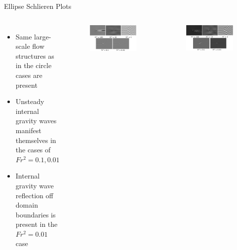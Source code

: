 \documentclass[aspectratio=169,xcolor=dvipsnames]{beamer}
\begin{document}
\begin{frame}{Ellipse Schlieren Plots}
    \begin{columns}[c]
        \begin{itemize}
            \item Same large-scale flow structures as in the circle cases are present
            \item Unsteady internal gravity waves manifest themselves in the cases of $Fr^2 = 0.1, 0.01$ 
            \item Internal gravity wave reflection off domain boundaries is present in the $Fr^2 = 0.01$ case
        \end{itemize}
        
        \vspace{-10pt}
        \begin{figure}
            \includegraphics[width=.8\textwidth]{figures/schlierenar0p5.png}
        \end{figure}
        \vspace{-10pt}
        \makebox[\linewidth]{\rule{\textwidth}{0.4pt}}
        \begin{figure}
            \includegraphics[width=.8\textwidth]{figures/schlierenar1p5.png}
        \end{figure}
    \end{columns}
\end{frame}
\end{document}
